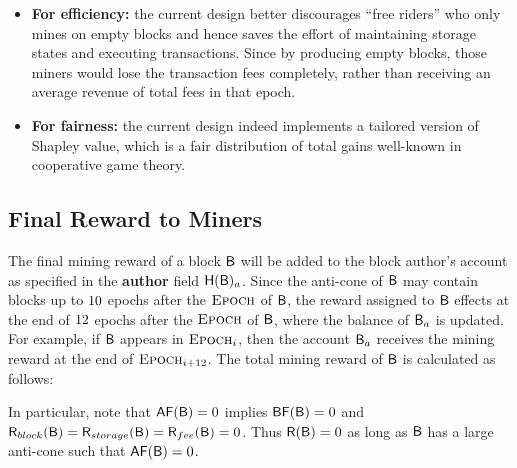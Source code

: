 {\begin{itemize}
		In conclusion, sharing transaction fee of $\tx$ only among blocks including $\tx$ provides a stronger incentive of referencing other blocks honestly.

		\item {\bf For efficiency:} 
		the current design better discourages ``free riders'' who only mines on empty blocks and hence saves the effort of  maintaining storage states and executing transactions.
		Since by producing empty blocks, those miners would lose the transaction fees completely, rather than receiving an average revenue of total fees in that epoch.

		\item {\bf For fairness:}
		the current design indeed implements a tailored version of Shapley value, which is a fair distribution of total gains well-known in cooperative game theory.
	\end{itemize}
}




\subsection{Final Reward to Miners}

The final mining reward of a block $\textsf{B}$ will be added to the block author's account as specified in the {\bf author} field $\textsf{H}(\textsf{B})_a$.
Since the anti-cone of $\textsf{B}$ may contain blocks up to ${10}$ epochs after the $\textsc{Epoch}$ of $\textsf{B}$,
the reward assigned to $\textsf{B}$ effects at the end of $12$ epochs after the $\textsc{Epoch}$ of $\textsf{B}$, where the balance of $\textsf{B}_a$ is updated.
For example, if $\textsf{B}$ appears in $\textsc{Epoch}_i$, then the account $\textsf{B}_a$ receives the mining reward at the end of $\textsc{Epoch}_{i+12}$. 
The total mining reward of $\textsf{B}$ is calculated as follows:

\oldversion{
	\begin{align}
		\reward(\block)\eqdef \af(\block)\cdot \award(\block)  + \feeaward(\block) = \af(\block)\cdot\basef(\block)\cdot\wf(\block)\cdot\award(\epoch_\block) + \feeaward(\block)
	\end{align}
}
\newversion{
	\begin{align}
	\reward(\block)\eqdef  \award(\block) + \storageaward(\block) + \feeaward(\block) 
\end{align}
}

In particular, note that $\mathsf{AF}(\textsf{B})=0$ implies $\mathsf{BF}(\textsf{B})=0$ and $\textsf{R}_{block}(\textsf{B})=\textsf{R}_{storage}(\textsf{B})=\textsf{R}_{fee}(\textsf{B})=0$.
Thus  
$\textsf{R}(\textsf{B})=0$ as long as $\textsf{B}$ has a large anti-cone such that $\mathsf{AF}(\textsf{B})=0$.






